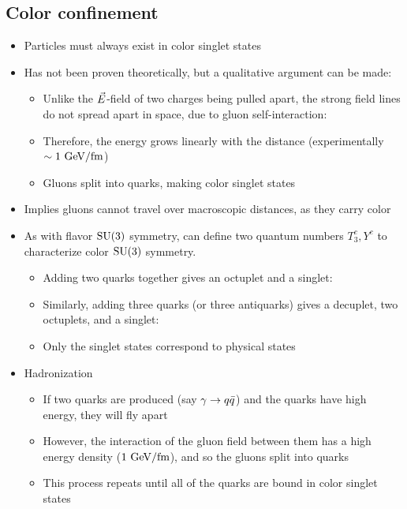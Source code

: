 \subsection{Color confinement}
\begin{itemize}
  \item Particles must always exist in color singlet states 
  \item Has not been proven theoretically, but a qualitative argument can be made:
  \begin{itemize}
    \item Unlike the $\vec{E}$-field of two charges being pulled apart, the strong field lines do not spread apart in space, due to gluon self-interaction:
    \item Therefore, the energy grows linearly with the distance (experimentally $\sim 1~\text{GeV}/\text{fm}$)
    \item Gluons split into quarks, making color singlet states
  \end{itemize}
  \item Implies gluons cannot travel over macroscopic distances, as they carry color
  \item As with flavor $\operatorname{SU}(3)$ symmetry, can define two quantum numbers $T_3^c,Y^c$ to characterize color $\operatorname{SU}(3)$ symmetry.
  \begin{itemize}
    \item Adding two quarks together gives an octuplet and a singlet:
    \item Similarly, adding three quarks (or three antiquarks) gives a decuplet, two octuplets, and a singlet:
    \item Only the singlet states correspond to physical states
  \end{itemize}
  \item Hadronization
  \begin{itemize}
    \item If two quarks are produced (say $\gamma\rightarrow q{\bar{q}}$) and the quarks have high energy, they will fly apart
    \item However, the interaction of the gluon field between them has a high energy density ($1~\text{GeV}/\text{fm}$), and so the gluons split into quarks
    \item This process repeats until all of the quarks are bound in color singlet states
  \end{itemize}
\end{itemize}

